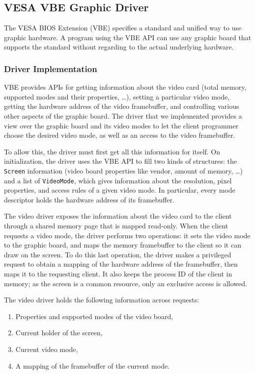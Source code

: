 \documentclass{report}
\begin{document}
\subsection{VESA VBE Graphic Driver}
The VESA BIOS Extension (VBE\cite{VBE}) specifies a standard and unified way to use graphic hardware. A program using the VBE API can use any graphic board that supports the standard without regarding to the actual underlying hardware.

\subsubsection{Driver Implementation}
VBE provides APIs for getting information about the video card (total memory, supported modes and their properties, \ldots), setting a particular video mode, getting the hardware address of the video framebuffer, and controlling various other aspects of the graphic board. The driver that we implemented provides a view over the graphic board and its video modes to let the client programmer choose the desired video mode, as well as an access to the video framebuffer.

To allow this, the driver must first get all this information for itself. On initialization, the driver uses the VBE API to fill two kinds of structures: the \texttt{Screen} information (video board properties like vendor, amount of memory, \ldots) and a list of \texttt{VideoMode}, which gives information about the resolution, pixel properties, and access rules of a given video mode. In particular, every mode descriptor holds the hardware address of its framebuffer.

The video driver exposes the information about the video card to the client through a shared memory page that is mapped read-only. When the client requests a video mode, the driver performs two operations: it sets the video mode to the graphic board, and maps the memory framebuffer to the client so it can draw on the screen. To do this last operation, the driver makes a privileged request to obtain a mapping of the hardware address of the framebuffer, then maps it to the requesting client. It also keeps the process ID of the client in memory; as the screen is a common resource, only an exclusive access is allowed.

The video driver holds the following information across requests:
\begin{enumerate}
\item Properties and supported modes of the video board,
\item Current holder of the screen,
\item Current video mode,
\item A mapping of the framebuffer of the current mode.
\end{enumerate}
\end{document}
